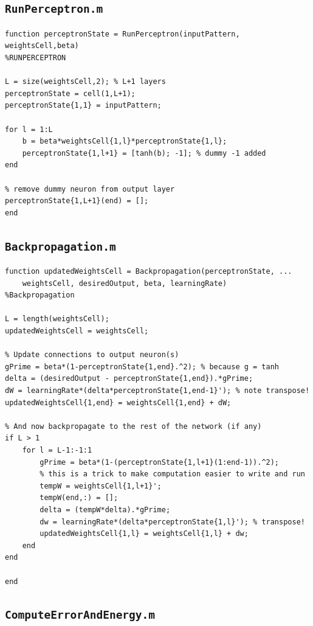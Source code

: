 \documentclass[12pt,titlepage]{article}
\begin{document}
\subsection*{\texttt{RunPerceptron.m}}

\begin{lstlisting}
function perceptronState = RunPerceptron(inputPattern, weightsCell,beta)
%RUNPERCEPTRON

L = size(weightsCell,2); % L+1 layers
perceptronState = cell(1,L+1);
perceptronState{1,1} = inputPattern;

for l = 1:L
    b = beta*weightsCell{1,l}*perceptronState{1,l};
    perceptronState{1,l+1} = [tanh(b); -1]; % dummy -1 added
end

% remove dummy neuron from output layer
perceptronState{1,L+1}(end) = [];
end
\end{lstlisting}

\subsection*{\texttt{Backpropagation.m}}

\begin{lstlisting}
function updatedWeightsCell = Backpropagation(perceptronState, ...
    weightsCell, desiredOutput, beta, learningRate)
%Backpropagation

L = length(weightsCell);
updatedWeightsCell = weightsCell;

% Update connections to output neuron(s) 
gPrime = beta*(1-perceptronState{1,end}.^2); % because g = tanh
delta = (desiredOutput - perceptronState{1,end}).*gPrime;
dW = learningRate*(delta*perceptronState{1,end-1}'); % note transpose!
updatedWeightsCell{1,end} = weightsCell{1,end} + dW;

% And now backpropagate to the rest of the network (if any)
if L > 1
    for l = L-1:-1:1
        gPrime = beta*(1-(perceptronState{1,l+1}(1:end-1)).^2);
        % this is a trick to make computation easier to write and run
        tempW = weightsCell{1,l+1}';
        tempW(end,:) = [];
        delta = (tempW*delta).*gPrime;
        dw = learningRate*(delta*perceptronState{1,l}'); % transpose!
        updatedWeightsCell{1,l} = weightsCell{1,l} + dw;
    end
end

end
\end{lstlisting}

\subsection*{\texttt{ComputeErrorAndEnergy.m}}
\end{document}
